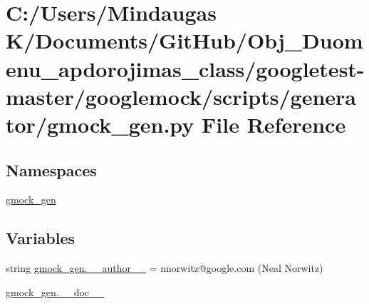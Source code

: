 \hypertarget{googletest-master_2googlemock_2scripts_2generator_2gmock__gen_8py}{}\section{C\+:/\+Users/\+Mindaugas K/\+Documents/\+Git\+Hub/\+Obj\+\_\+\+Duomenu\+\_\+apdorojimas\+\_\+class/googletest-\/master/googlemock/scripts/generator/gmock\+\_\+gen.py File Reference}
\label{googletest-master_2googlemock_2scripts_2generator_2gmock__gen_8py}
\subsection*{Namespaces}
\begin{DoxyCompactItemize}
\item 
 \mbox{\hyperlink{namespacegmock__gen}{gmock\+\_\+gen}}
\end{DoxyCompactItemize}
\subsection*{Variables}
\begin{DoxyCompactItemize}
\item 
string \mbox{\hyperlink{namespacegmock__gen_adab615bb903ccd6be037728cbd62057b}{gmock\+\_\+gen.\+\_\+\+\_\+author\+\_\+\+\_\+}} = \textquotesingle{}nnorwitz@google.\+com (Neal Norwitz)\textquotesingle{}
\item 
\mbox{\hyperlink{namespacegmock__gen_af72474983cae3039ab18452d6ff6a4ed}{gmock\+\_\+gen.\+\_\+\+\_\+doc\+\_\+\+\_\+}}
\end{DoxyCompactItemize}
